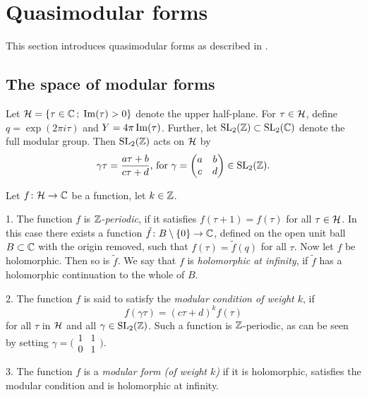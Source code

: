\section{Quasimodular forms} \label{quasimodular-forms}

This section introduces quasimodular forms as described in \cite{Kaneko-Zagier1995}.

\subsection{The space of modular forms}

Let $\mathcal{H}=\{\tau \in \mathbb{C} \,;\; \operatorname{Im}(\tau)>0\}$ denote the upper half-plane. For $\tau \in \mathcal{H}$, define $q=\exp(2\pi i\tau)$ and $Y=4\pi\operatorname{Im}(\tau)$. Further, let $\operatorname{SL}_2(\mathbb{Z}) \subset \operatorname{SL}_2(\mathbb{C})$ denote the full modular group. Then $\operatorname{SL}_2(\mathbb{Z})$ acts \if\footnotemark\fi on $\mathcal{H}$ by 
\[\gamma\tau = \frac{a\tau + b}{c\tau + d}\text{, for }\gamma = 
\begin{pmatrix}
 a & b \\
 c & d
\end{pmatrix}
\in \operatorname{SL}_2(\mathbb{Z}). 
\]


\begin{defi} Let $f\colon \mathcal{H} \to \mathbb{C}$ be a function, let $k\in \mathbb{Z}$.

  1. The function $f$ is \emph{$\mathbb{Z}$-periodic}, if it satisfies $f(\tau + 1) = f(\tau)$ for all $\tau \in \mathcal{H}$. In this case there exists a  function $\tilde f\colon B\setminus \{0\} \to \mathbb{C}$, defined on the open unit ball $B\subset \mathbb{C}$ with the origin removed, such that $f(\tau)=\tilde f(q)$ for all $\tau$. Now let $f$ be holomorphic. Then so is $\tilde f$. We say that $f$ is \emph{holomorphic at infinity}, if $\tilde f$ has a holomorphic continuation to the whole of $B$.
  
  2. The function $f$ is said to satisfy the \emph{modular condition of weight $k$}, if \[f(\gamma\tau)=(c\tau+d)^kf(\tau)\] for all $\tau$ in $\mathcal{H}$ and all $\gamma \in \operatorname{SL}_2(\mathbb{Z})$. Such a function is $\mathbb{Z}$-periodic, as can be seen by setting $\gamma = 
\bigl(\begin{smallmatrix}
 1 & 1 \\
 0 & 1
\end{smallmatrix}\bigr).$
  
  3. The function $f$ is a \emph{modular form (of weight $k$)} if it is holomorphic, satisfies the modular condition and is holomorphic at infinity.
\end{defi}

